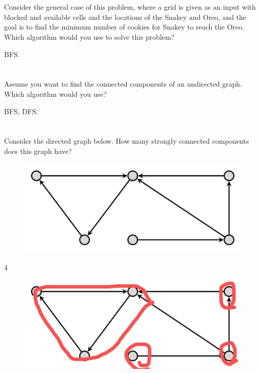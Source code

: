 \documentclass [12pt]{article}
\begin{document}
\section{} Consider the general case of this problem, where a grid is given as an input with blocked and available cells and the locations of the Snakey and Oreo, and the goal is to find the minimum number of cookies for Snakey to reach the Oreo. Which algorithm would you use to solve this problem?

\begin{Solution}
BFS.
\end{Solution}


\section{} Assume you want to find the connected components of an undirected graph. Which algorithm would you use?

\begin{Solution}
BFS, DFS.
\end{Solution}


\section{} Consider the directed graph below. How many strongly connected components does this graph have?

\begin{figure}[H]
    \centering
    \includegraphics[scale=0.5]{2.png} 
    \label{fig:my_label}
\end{figure}

\begin{Solution}
4
\begin{figure}[H]
    \centering
    \includegraphics[scale=0.2]{4.jpeg} 
    \label{fig:my_label}
\end{figure}
\end{Solution}
\end{document}
